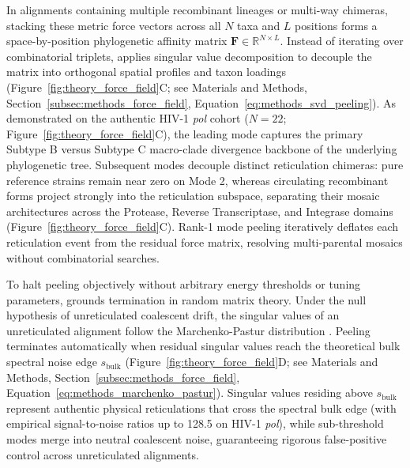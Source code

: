 In alignments containing multiple recombinant lineages or multi-way chimeras, stacking these metric force vectors across all $N$ taxa and $L$ positions forms a space-by-position phylogenetic affinity matrix $\mathbf{F} \in \mathbb{R}^{N \times L}$.
Instead of iterating over combinatorial triplets, \RhizAeon applies singular value decomposition to decouple the matrix into orthogonal spatial profiles and taxon loadings (Figure~\ref{fig:theory_force_field}C; see Materials and Methods, Section~\ref{subsec:methods_force_field}, Equation~\eqref{eq:methods_svd_peeling}).
As demonstrated on the authentic HIV-1 \textit{pol} cohort ($N = 22$; Figure~\ref{fig:theory_force_field}C), the leading mode captures the primary Subtype B versus Subtype C macro-clade divergence backbone of the underlying phylogenetic tree.
Subsequent modes decouple distinct reticulation chimeras: pure reference strains remain near zero on Mode 2, whereas circulating recombinant forms project strongly into the reticulation subspace, separating their mosaic architectures across the Protease, Reverse Transcriptase, and Integrase domains (Figure~\ref{fig:theory_force_field}C).
Rank-1 mode peeling iteratively deflates each reticulation event from the residual force matrix, resolving multi-parental mosaics without combinatorial searches.

To halt peeling objectively without arbitrary energy thresholds or tuning parameters, \RhizAeon grounds termination in random matrix theory.
Under the null hypothesis of unreticulated coalescent drift, the singular values of an unreticulated alignment follow the Marchenko-Pastur distribution \citep{marchenko1967distribution}.
Peeling terminates automatically when residual singular values reach the theoretical bulk spectral noise edge $s_{\text{bulk}}$ (Figure~\ref{fig:theory_force_field}D; see Materials and Methods, Section~\ref{subsec:methods_force_field}, Equation~\eqref{eq:methods_marchenko_pastur}).
Singular values residing above $s_{\text{bulk}}$ represent authentic physical reticulations that cross the spectral bulk edge (with empirical signal-to-noise ratios up to 128.5 on HIV-1 \textit{pol}), while sub-threshold modes merge into neutral coalescent noise, guaranteeing rigorous false-positive control across unreticulated alignments.

